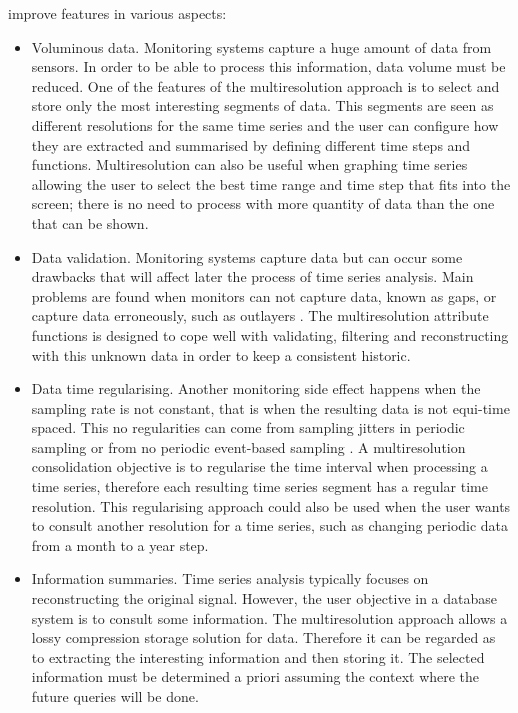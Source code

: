  improve  features in various aspects:
\begin{itemize}

\item Voluminous data. Monitoring systems capture a huge amount of
  data from sensors. In order to be able to process this information,
  data volume must be reduced. One of the features of the
  multiresolution approach is to select and store only the most
  interesting segments of data. This segments are seen as different
  resolutions for the same time series and the user can configure how
  they are extracted and summarised by defining different time steps
  and functions. Multiresolution can also be useful when graphing time
  series allowing the user to select the best time range and time
  step that fits into the screen; there is no need to process with
  more quantity of data than the one that can be
  shown.%

\item Data validation. Monitoring systems capture data but can occur
  some drawbacks that will affect later the process of time series
  analysis. Main problems are found when monitors can not capture
  data, known as gaps, or capture data erroneously, such as outlayers .
  The multiresolution attribute functions is designed to cope well
  with validating, filtering and reconstructing with this unknown data
  in order to keep a consistent
  historic.%

\item Data time regularising. Another monitoring side effect happens
  when the sampling rate is not constant, that is when the resulting
  data is not equi-time spaced. This no regularities can come from
  sampling jitters in periodic sampling or from no periodic
  event-based sampling \cite{kopetz11:realtime}. A multiresolution
  consolidation objective is to regularise the time interval when
  processing a time series, therefore each resulting time series
  segment has a regular time resolution. This regularising approach
  could also be used when the user wants to consult another resolution
  for a time series, such as changing periodic data from a month to a
  year step. %

\item Information summaries. Time series analysis typically focuses on
  reconstructing the original signal. However, the user objective in a
  database system is to consult some information. The multiresolution
  approach allows a lossy compression storage solution for data. Therefore
  it can be regarded as to extracting the interesting information and
  then storing it. The selected information must be determined a
  priori assuming the context where the future queries will be done.
\end{itemize}


